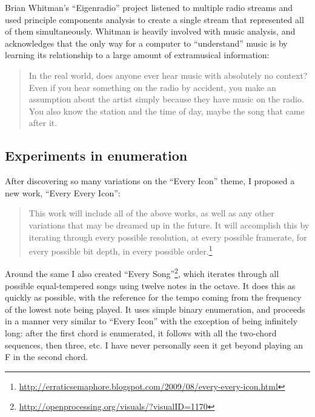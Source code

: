 \documentclass{thesis}
\begin{document}
	Brian Whitman's ``Eigenradio''\cite{brian_whitman_eigenradio_2005} project listened to multiple radio streams and used principle components analysis to create a single stream that represented all of them simultaneously. Whitman is heavily involved with music analysis, and acknowledges that the only way for a computer to ``understand'' music is by learning its relationship to a large amount of extramusical information:
	
	\begin{quote}
	In the real world, does anyone ever hear music with absolutely no context? Even if you hear something on the radio by accident, you make an assumption about the artist simply because they have music on the radio. You also know the station and the time of day, maybe the song that came after it.
	\end{quote}
		
\subsection{Experiments in enumeration}

	After discovering so many variations on the ``Every Icon'' theme, I proposed a new work, ``Every Every Icon'':
	
	\begin{quote}
	This work will include all of the above works, as well as any other variations that may be dreamed up in the future. It will accomplish this by iterating through every possible resolution, at every possible framerate, for every possible bit depth, in every possible order.\footnote{\url{http://erraticsemaphore.blogspot.com/2009/08/every-every-icon.html}}
	\end{quote}
	
	Around the same I also created ``Every Song''\footnote{\url{http://openprocessing.org/visuals/?visualID=1170}}, which iterates through all possible equal-tempered songs using twelve notes in the octave. It does this as quickly as possible, with the reference for the tempo coming from the frequency of the lowest note being played. It uses simple binary enumeration, and proceeds in a manner very similar to ``Every Icon'' with the exception of being infinitely long: after the first chord is enumerated, it follows with all the two-chord sequences, then three, etc. I have never personally seen it get beyond playing an F in the second chord.
\end{document}
